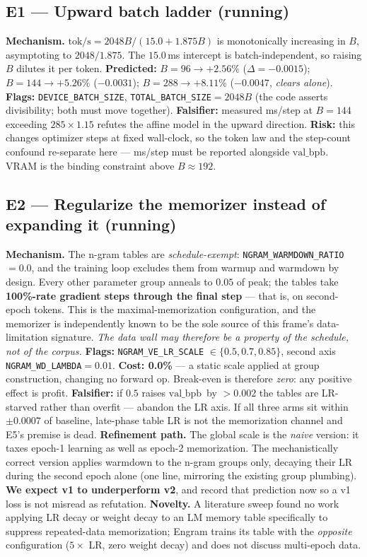 \documentclass{article}
\newcommand{\valbpb}{\mathrm{val\_bpb}}
\begin{document}
\subsection{E1 --- Upward batch ladder (running)}
\textbf{Mechanism.} $\mathrm{tok/s} = 2048B/(15.0+1.875B)$ is monotonically increasing in
$B$, asymptoting to $2048/1.875$. The $15.0$\,ms intercept is batch-independent, so raising
$B$ dilutes it per token. \textbf{Predicted:} $B{=}96 \to +2.56\%$ ($\Delta{=}-0.0015$);
$B{=}144 \to +5.26\%$ ($-0.0031$); $B{=}288 \to +8.11\%$ ($-0.0047$, \emph{clears alone}).
\textbf{Flags:} \texttt{DEVICE\_BATCH\_SIZE}, \texttt{TOTAL\_BATCH\_SIZE}$=2048B$ (the code
asserts divisibility; both must move together). \textbf{Falsifier:} measured ms/step at
$B{=}144$ exceeding $285\times1.15$ refutes the affine model in the upward direction.
\textbf{Risk:} this changes optimizer steps at fixed wall-clock, so the token law and the
step-count confound re-separate here --- ms/step must be reported alongside $\valbpb$. VRAM is
the binding constraint above $B{\approx}192$.

\subsection{E2 --- Regularize the memorizer instead of expanding it (running)}
\textbf{Mechanism.} The n-gram tables are \emph{schedule-exempt}:
\texttt{NGRAM\_WARMDOWN\_RATIO}$=0.0$, and the training loop excludes them from warmup and
warmdown by design. Every other parameter group anneals to $0.05$ of peak; the tables take
\textbf{100\%-rate gradient steps through the final step} --- that is, on second-epoch
tokens. This is the maximal-memorization configuration, and the memorizer is independently
known to be the sole source of this frame's data-limitation signature. \emph{The data wall
may therefore be a property of the schedule, not of the corpus.}
\textbf{Flags:} \texttt{NGRAM\_VE\_LR\_SCALE} $\in \{0.5, 0.7, 0.85\}$, second axis
\texttt{NGRAM\_WD\_LAMBDA}$=0.01$. \textbf{Cost: 0.0\%} --- a static scale applied at group
construction, changing no forward op. Break-even is therefore \emph{zero}: any positive
effect is profit.
\textbf{Falsifier:} if $0.5$ raises $\valbpb$\ by ${>}0.002$ the tables are LR-starved rather
than overfit --- abandon the LR axis. If all three arms sit within $\pm0.0007$ of baseline,
late-phase table LR is not the memorization channel and E5's premise is dead.
\textbf{Refinement path.} The global scale is the \emph{naive} version: it taxes epoch-1
learning as well as epoch-2 memorization. The mechanistically correct version applies
warmdown to the n-gram groups only, decaying their LR during the second epoch alone
(one line, mirroring the existing group plumbing). \textbf{We expect v1 to underperform v2},
and record that prediction now so a v1 loss is not misread as refutation.
\textbf{Novelty.} A literature sweep found no work applying LR decay or weight decay to an
LM memory table specifically to suppress repeated-data memorization; Engram trains its table
with the \emph{opposite} configuration ($5\times$ LR, zero weight decay) and does not discuss
multi-epoch data.
\end{document}
